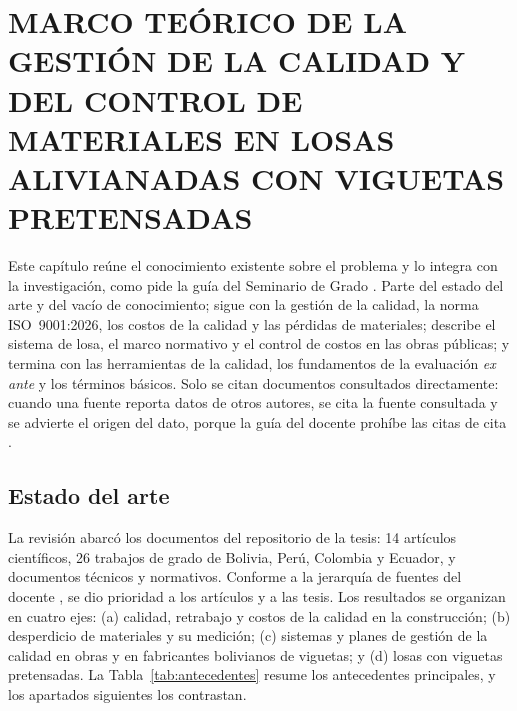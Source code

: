 \chapter{MARCO TEÓRICO DE LA GESTIÓN DE LA CALIDAD Y DEL CONTROL DE MATERIALES EN LOSAS ALIVIANADAS CON VIGUETAS PRETENSADAS}
\label{cap:marco}

Este capítulo reúne el conocimiento existente sobre el problema y lo integra con la investigación, como pide la guía del Seminario de Grado \parencite[diapositiva~8]{barrios2021citas}. Parte del estado del arte y del vacío de conocimiento; sigue con la gestión de la calidad, la norma ISO~9001:2026, los costos de la calidad y las pérdidas de materiales; describe el sistema de losa, el marco normativo y el control de costos en las obras públicas; y termina con las herramientas de la calidad, los fundamentos de la evaluación \emph{ex ante} y los términos básicos. Solo se citan documentos consultados directamente: cuando una fuente reporta datos de otros autores, se cita la fuente consultada y se advierte el origen del dato, porque la guía del docente prohíbe las citas de cita \parencite[diapositiva~18]{barrios2021citas}.

\section{Estado del arte}
\label{sec:estado-arte}

La revisión abarcó los documentos del repositorio de la tesis: 14 artículos científicos, 26 trabajos de grado de Bolivia, Perú, Colombia y Ecuador, y documentos técnicos y normativos. Conforme a la jerarquía de fuentes del docente \parencite[diapositiva~24]{barrios2021documento}, se dio prioridad a los artículos y a las tesis. Los resultados se organizan en cuatro ejes: (a) calidad, retrabajo y costos de la calidad en la construcción; (b) desperdicio de materiales y su medición; (c) sistemas y planes de gestión de la calidad en obras y en fabricantes bolivianos de viguetas; y (d) losas con viguetas pretensadas. La Tabla~\ref{tab:antecedentes} resume los antecedentes principales, y los apartados siguientes los contrastan.

